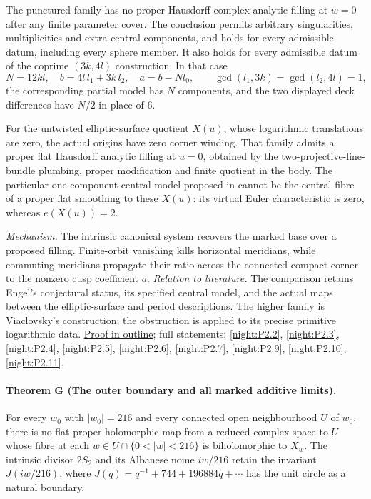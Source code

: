 \documentclass[11pt,a4paper]{article}
\theoremstyle{definition}
\begin{document}
The punctured family has no proper Hausdorff complex-analytic
filling at $w=0$ after any finite parameter cover.  The conclusion
permits arbitrary singularities, multiplicities and extra central
components, and holds for every admissible datum, including every
sphere member.  It also holds for every admissible datum of the
coprime $(3k,4l)$ construction.  In that case
\[
 N=12kl,\quad b=4l\,l_1+3k\,l_2,\quad a=b-Nl_0,
 \qquad \gcd(l_1,3k)=\gcd(l_2,4l)=1,
\]
the corresponding partial model has $N$ components, and the two
displayed deck differences have $N/2$ in place of 6.

For the untwisted elliptic-surface quotient $X(u)$, whose
logarithmic translations are zero, the actual origins have zero
corner winding.  That family admits a proper flat Hausdorff
analytic filling at $u=0$, obtained by the two-projective-line-bundle
plumbing, proper modification and finite quotient in the body.
The particular one-component central model proposed in
\cite[Conjecture~8.2, p.~22]{Engel2026} cannot be the central
fibre of a proper flat smoothing to these $X(u)$: its virtual
Euler characteristic is zero, whereas $e(X(u))=2$.

\textit{Mechanism.} The intrinsic canonical system recovers the
marked base over a proposed filling.  Finite-orbit vanishing kills
horizontal meridians, while commuting meridians propagate their
ratio across the connected compact corner to the nonzero cusp
coefficient $a$.
\textit{Relation to literature.} The comparison retains Engel's
conjectural status, its specified central model, and the actual
maps between the elliptic-surface and period descriptions.  The
higher family is Viaclovsky's construction; the obstruction is
applied to its precise primitive logarithmic data.
\hyperlink{outline-I-F}{Proof in outline}; full statements:
\ref{night:P2.2}, \ref{night:P2.3}, \ref{night:P2.4},
\ref{night:P2.5}, \ref{night:P2.6}, \ref{night:P2.7},
\ref{night:P2.9}, \ref{night:P2.10}, \ref{night:P2.11}.

\hypertarget{main-I-G}{}
\paragraph{Theorem G (The outer boundary and all marked additive limits).}
\label{series:I:G}
For every $w_0$ with $|w_0|=216$ and every connected open
neighbourhood $U$ of $w_0$, there is no flat proper holomorphic
map from a reduced complex space to $U$ whose fibre at each
$w\in U\cap\{0<|w|<216\}$ is biholomorphic to $X_w$.
The intrinsic divisor $2S_2$ and its Albanese nome $iw/216$
retain the invariant $J(iw/216)$, where
$J(q)=q^{-1}+744+196884q+\cdots$ has the unit circle as a
natural boundary.
\end{document}

